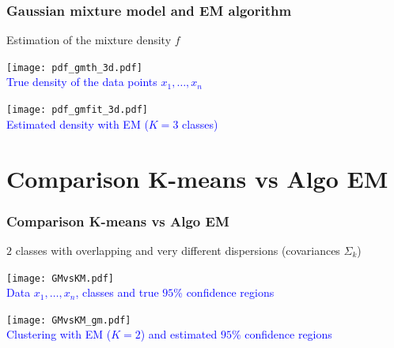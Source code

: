 \documentclass[compress, smaller, serif, 9pt]{beamer}
\begin{document}
\begin{frame}
   \frametitle{Gaussian mixture model and EM algorithm}
   \begin{block}{Estimation of the mixture density $f$}
   \end{block}
   \begin{minipage}{.49\textwidth}
   \begin{center}
    \texttt{[image: pdf\_gmth\_3d.pdf]}\\
    \textcolor{blue}{True density of the data points $x_1,\ldots,x_n$}
    \end{center}
    \end{minipage} \hfill
    \begin{minipage}{.49\textwidth}
   \begin{center}
    \texttt{[image: pdf\_gmfit\_3d.pdf]}\\
    \textcolor{blue}{Estimated density with EM ($K=3$ classes)}
    \end{center}
    \end{minipage}
\end{frame}

\section{Comparison K-means vs Algo EM}

\begin{frame}
   \frametitle{Comparison K-means vs Algo EM}

   \begin{block}{$2$ classes with overlapping and very different dispersions (covariances $\Sigma_k$) }
   \end{block}

\begin{minipage}{.49\textwidth}
\begin{center}
    \texttt{[image: GMvsKM.pdf]}\\
    \textcolor{blue}{Data $x_1,\ldots,x_n$, classes and true $95$\% confidence regions}
\end{center}
\end{minipage}
\hfill
\begin{minipage}{.49\textwidth}
\begin{center}
    \texttt{[image: GMvsKM\_gm.pdf]}\\
    \textcolor{blue}{Clustering with EM ($K=2$) and estimated $95$\% confidence regions}
\end{center}
\end{minipage}

\end{frame}
\end{document}
